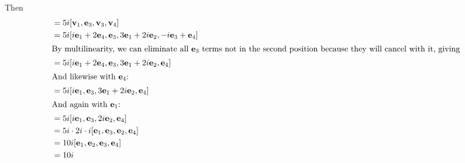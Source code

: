 Then
\begin{align*}
	[\vb v_1, \vb v_2, \vb v_3, \vb v_4]
	 & = 5i[\vb v_1, \vb e_3, \vb v_3, \vb v_4]                                      \\
	 & = 5i[i\vb e_1 + 2\vb e_4, \vb e_3, 3\vb e_1 + 2i\vb e_2, -i\vb e_3 + \vb e_4] \\
	\intertext{By multilinearity, we can eliminate all \(\vb e_3\) terms not in the second position because they will cancel with it, giving}
	 & = 5i[i\vb e_1 + 2\vb e_4, \vb e_3, 3\vb e_1 + 2i\vb e_2, \vb e_4]             \\
	\intertext{And likewise with \(\vb e_4\):}
	 & = 5i[i\vb e_1, \vb e_3, 3\vb e_1 + 2i\vb e_2, \vb e_4]                        \\
	\intertext{And again with \(\vb e_1\):}
	 & = 5i[i\vb e_1, \vb e_3, 2i\vb e_2, \vb e_4]                                   \\
	 & = 5i\cdot 2i \cdot i[\vb e_1, \vb e_3, \vb e_2, \vb e_4]                      \\
	 & = 10i[\vb e_1, \vb e_2, \vb e_3, \vb e_4]                                     \\
	 & = 10i
\end{align*}

